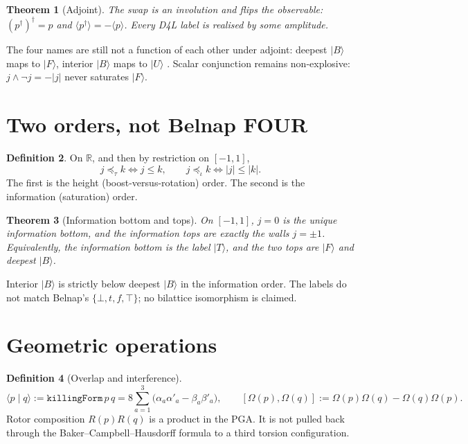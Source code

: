 \documentclass[dvipdfmx,11pt,a4paper]{article}
\newtheorem{theorem}{Theorem}[section]
\theoremstyle{definition}
\newtheorem{definition}[theorem]{Definition}
\theoremstyle{remark}
\begin{document}
\begin{theorem}[Adjoint]
\label{thm:adjoint}
The swap is an involution and flips the observable:
\( (p^\dagger)^\dagger=p \) and \(\langle p^\dagger\rangle=-\langle p\rangle\).
Every D4L label is realised by some amplitude.
\end{theorem}

The four names are still not a function of each other under adjoint:
deepest \(\lvert B\rangle\) maps to \(\lvert F\rangle\), interior
\(\lvert B\rangle\) maps to \(\lvert U\rangle\) \cite{D4L2026}. Scalar
conjunction remains non-explosive: \(j\wedge\neg j=-|j|\) never
saturates \(\lvert F\rangle\).

\section{Two orders, not Belnap FOUR}

\begin{definition}
On \(\mathbb{R}\), and then by restriction on \([-1,1]\),
\[
j\preceq_\tau k \iff j\le k,
\qquad
j\preceq_\iota k \iff \lvert j\rvert\le\lvert k\rvert.
\]
The first is the height (boost-versus-rotation) order. The second is
the information (saturation) order.
\end{definition}

\begin{theorem}[Information bottom and tops]
\label{thm:info}
On \([-1,1]\), \(j=0\) is the unique information bottom, and the
information tops are exactly the walls \(j=\pm 1\). Equivalently, the
information bottom is the label \(\lvert T\rangle\), and the two tops
are \(\lvert F\rangle\) and deepest \(\lvert B\rangle\).
\end{theorem}

Interior \(\lvert B\rangle\) is strictly below deepest \(\lvert B\rangle\)
in the information order. The labels do not match Belnap's
\(\{\bot,t,f,\top\}\); no bilattice isomorphism is claimed.

\section{Geometric operations}

\begin{definition}[Overlap and interference]
\[
\langle p\mid q\rangle := \texttt{killingForm}\,p\,q
= 8\sum_{a=1}^3\bigl(\alpha_a\alpha'_a-\beta_a\beta'_a\bigr),
\qquad
[\Omega(p),\Omega(q)] := \Omega(p)\Omega(q)-\Omega(q)\Omega(p).
\]
Rotor composition \(R(p)R(q)\) is a product in the PGA. It is not
pulled back through the Baker--Campbell--Hausdorff formula to a third
torsion configuration.
\end{definition}
\end{document}
